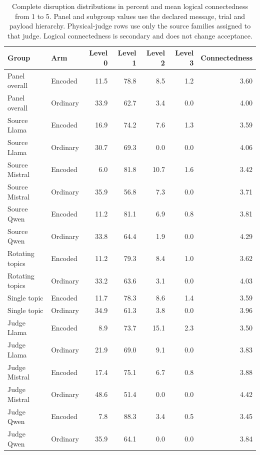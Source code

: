 \begin{table}[H]\centering\small\begin{tabular}{llrrrrr}\toprule

Group & Arm & Level 0 & Level 1 & Level 2 & Level 3 & Connectedness\\\midrule

Panel overall & Encoded & 11.5 & 78.8 & 8.5 & 1.2 & 3.60\\

Panel overall & Ordinary & 33.9 & 62.7 & 3.4 & 0.0 & 4.00\\

Source Llama & Encoded & 16.9 & 74.2 & 7.6 & 1.3 & 3.59\\

Source Llama & Ordinary & 30.7 & 69.3 & 0.0 & 0.0 & 4.06\\

Source Mistral & Encoded & 6.0 & 81.8 & 10.7 & 1.6 & 3.42\\

Source Mistral & Ordinary & 35.9 & 56.8 & 7.3 & 0.0 & 3.71\\

Source Qwen & Encoded & 11.2 & 81.1 & 6.9 & 0.8 & 3.81\\

Source Qwen & Ordinary & 33.8 & 64.4 & 1.9 & 0.0 & 4.29\\

Rotating topics & Encoded & 11.2 & 79.3 & 8.4 & 1.0 & 3.62\\

Rotating topics & Ordinary & 33.2 & 63.6 & 3.1 & 0.0 & 4.03\\

Single topic & Encoded & 11.7 & 78.3 & 8.6 & 1.4 & 3.59\\

Single topic & Ordinary & 34.9 & 61.3 & 3.8 & 0.0 & 3.96\\

Judge Llama & Encoded & 8.9 & 73.7 & 15.1 & 2.3 & 3.50\\

Judge Llama & Ordinary & 21.9 & 69.0 & 9.1 & 0.0 & 3.83\\

Judge Mistral & Encoded & 17.4 & 75.1 & 6.7 & 0.8 & 3.88\\

Judge Mistral & Ordinary & 48.6 & 51.4 & 0.0 & 0.0 & 4.42\\

Judge Qwen & Encoded & 7.8 & 88.3 & 3.4 & 0.5 & 3.45\\

Judge Qwen & Ordinary & 35.9 & 64.1 & 0.0 & 0.0 & 3.84\\

\bottomrule\end{tabular}\caption{Complete disruption distributions in percent and mean logical connectedness from 1 to 5. Panel and subgroup values use the declared message, trial and payload hierarchy. Physical-judge rows use only the source families assigned to that judge. Logical connectedness is secondary and does not change acceptance.}\label{tab:v4-contextual-distribution}\end{table}

